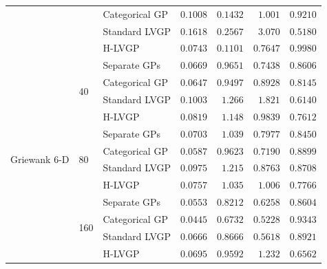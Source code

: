 \begin{table}[htbp]
\begin{tabular}{lllrrrr}
 &  & Categorical GP & $0.1008$ & $0.1432$ & $1.001$ & \colorbox{green!20}{\boldmath$0.9210$} \\
 &  & Standard LVGP & $0.1618$ & $0.2567$ & $3.070$ & $0.5180$ \\
 &  & H-LVGP & \colorbox{green!20}{\boldmath$0.0743$} & \colorbox{green!20}{\boldmath$0.1101$} & \colorbox{green!20}{\boldmath$0.7647$} & $0.9980$ \\
\midrule
\multirow{12}{*}{Griewank 6-D} & \multirow{4}{*}{40} & Separate GPs & $0.0669$ & $0.9651$ & \colorbox{green!20}{\boldmath$0.7438$} & \colorbox{green!20}{\boldmath$0.8606$} \\
 &  & Categorical GP & \colorbox{green!20}{\boldmath$0.0647$} & \colorbox{green!20}{\boldmath$0.9497$} & $0.8928$ & $0.8145$ \\
 &  & Standard LVGP & $0.1003$ & $1.266$ & $1.821$ & $0.6140$ \\
 &  & H-LVGP & $0.0819$ & $1.148$ & $0.9839$ & $0.7612$ \\
\cmidrule(lr){2-7}
 & \multirow{4}{*}{80} & Separate GPs & $0.0703$ & $1.039$ & $0.7977$ & $0.8450$ \\
 &  & Categorical GP & \colorbox{green!20}{\boldmath$0.0587$} & \colorbox{green!20}{\boldmath$0.9623$} & \colorbox{green!20}{\boldmath$0.7190$} & \colorbox{green!20}{\boldmath$0.8899$} \\
 &  & Standard LVGP & $0.0975$ & $1.215$ & $0.8763$ & $0.8708$ \\
 &  & H-LVGP & $0.0757$ & $1.035$ & $1.006$ & $0.7766$ \\
\cmidrule(lr){2-7}
 & \multirow{4}{*}{160} & Separate GPs & $0.0553$ & $0.8212$ & $0.6258$ & $0.8604$ \\
 &  & Categorical GP & \colorbox{green!20}{\boldmath$0.0445$} & \colorbox{green!20}{\boldmath$0.6732$} & \colorbox{green!20}{\boldmath$0.5228$} & \colorbox{green!20}{\boldmath$0.9343$} \\
 &  & Standard LVGP & $0.0666$ & $0.8666$ & $0.5618$ & $0.8921$ \\
 &  & H-LVGP & $0.0695$ & $0.9592$ & $1.232$ & $0.6562$ \\
\bottomrule
\end{tabular}
\end{table}
